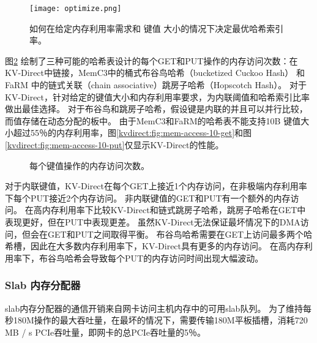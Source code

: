 \begin{figure}[t]
	\centering
	\texttt{[image: optimize.png]}
	\caption{如何在给定内存利用率需求和 键值 大小的情况下决定最优哈希索引率。}
	\label{kvdirect:fig:hashline-ratio}
\end{figure}

图\ref {kvdirect:fig:mem-access-tput} 绘制了三种可能的哈希表设计的每个GET和PUT操作的内存访问次数：在KV-Direct中链接，MemC3中的桶式布谷鸟哈希（bucketized Cuckoo Hash）\cite {fan2013memc3} 和FaRM \cite {dragojevic2014farm} 中的链式关联（chain associative）跳房子哈希（Hopscotch Hash）。
对于KV-Direct，针对给定的键值大小和内存利用率要求，为内联阈值和哈希索引比率做出最佳选择。
对于布谷鸟和跳房子哈希，假设键是内联的并且可以并行比较，而值存储在动态分配的板中。
由于MemC3和FaRM的哈希表不能支持10B 键值大小超过55％的内存利用率，图\ref {kvdirect:fig:mem-access-10-get}和图\ref {kvdirect:fig:mem-access-10-put}仅显示KV-Direct的性能。


\begin{figure}[t]
	\centering
	
	\vfill
	
	\caption{每个键值操作的内存访问次数。}
	\label{kvdirect:fig:mem-access-tput}
\end{figure}


对于内联键值，KV-Direct在每个GET上接近1个内存访问，在非极端内存利用率下每个PUT接近2个内存访问。
非内联键值的GET和PUT有一个额外的内存访问。
在高内存利用率下比较KV-Direct和链式跳房子哈希，跳房子哈希在GET中表现更好，但在PUT中表现更差。
虽然KV-Direct无法保证最坏情况下的DMA访问，但会在GET和PUT之间取得平衡。
布谷鸟哈希需要在GET上访问最多两个哈希槽，因此在大多数内存利用率下，KV-Direct具有更多的内存访问。
在高内存利用率下，布谷鸟哈希会导致每个PUT的内存访问时间出现大幅波动。


\subsubsection{Slab 内存分配器}
\label{kvdirect:sec:slab-eval}

slab内存分配器的通信开销来自网卡访问主机内存中的可用slab队列。
为了维持每秒180M操作的最大吞吐量，在最坏的情况下，需要传输180M平板插槽，消耗720 MB / s PCIe吞吐量，即网卡的总PCIe吞吐量的5％。

